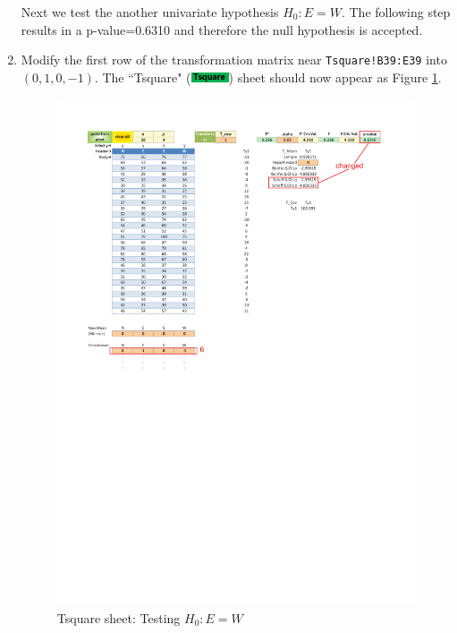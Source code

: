 \documentclass[article]{jss}
\newcommand{\shtTsquare}{``Tsquare" (\includegraphics[height=8pt, keepaspectratio=true]{TsquareSheetTab_png}) }
\begin{document}
\begin{enumerate}
                
                
                Next we test the another univariate hypothesis $H_0: E = W$. The following step results in a p-value=0.6310 and therefore the null hypothesis is accepted.
                
                \item Modify the first row of the transformation matrix near \texttt{Tsquare!B39:E39} into $(0,1,0,-1)$. The \shtTsquare sheet should now appear as Figure \ref{fig:Tsquare_E=W}.
                \begin{figure}[!tbh]
                        \includegraphics[width=\linewidth,keepaspectratio=true]{img/TsquareSheetOutput2_markup}
                        \vspace{-25pt}\centering\protect\caption{Tsquare sheet: Testing $H_0: E = W$}\label{fig:Tsquare_E=W}
                \end{figure}
                

\end{enumerate}
\end{document}
